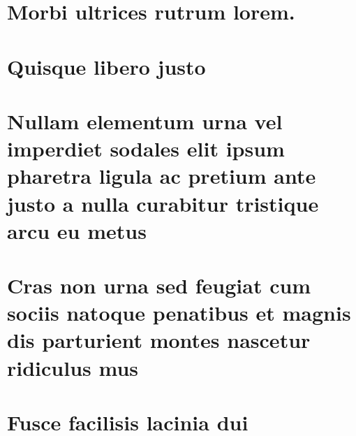 \documentclass[
	12pt,				%
	openright,			%
	twoside,			%
	a4paper,			%
	english,			%
	brazil				%
	]{abntex2}
\begin{document}
\begin{anexosenv}

\partanexos

\chapter{Morbi ultrices rutrum lorem.}
\lipsum[30]
\chapter{Quisque libero justo}

\lipsum[50]

\chapter{Nullam elementum urna vel imperdiet sodales elit ipsum pharetra ligula
	ac pretium ante justo a nulla curabitur tristique arcu eu metus}
\lipsum[55-57]
\chapter{Cras non urna sed feugiat cum sociis natoque penatibus et magnis dis
	parturient montes nascetur ridiculus mus}

\lipsum[31]

\chapter{Fusce facilisis lacinia dui}

\lipsum[32]

\end{anexosenv}

\printindex
\end{document}
